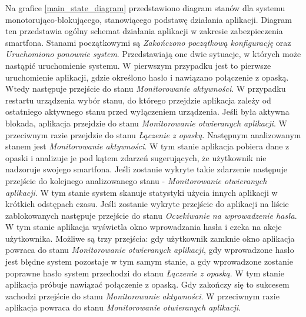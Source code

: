 Na grafice \ref{main_state_diagram} przedstawiono diagram stanów dla systemu monotorująco-blokującego, stanowiącego podstawę działania aplikacji. Diagram ten przedstawia ogólny schemat działania aplikacji w zakresie zabezpieczenia smartfona. Stanami początkowymi są \textit{Zakończono początkową konfigurację} oraz \textit{Uruchomiono ponownie system}. Przedstawiają one dwie sytuacje, w których może nastąpić uruchomienie systemu. W pierwszym przypadku jest to pierwsze uruchomienie aplikacji, gdzie określono hasło i nawiązano połączenie z opaską. Wtedy następuje przejście do stanu \textit{Monitorowanie aktywności}. W przypadku restartu urządzenia wybór stanu, do którego przejdzie aplikacja zależy od ostatniego aktywnego stanu przed wyłączeniem urządzenia. Jeśli była aktywna blokada, aplikacja przejdzie do stanu \textit{Monitorowanie otwieranych aplikacji}. W przeciwnym razie przejdzie do stanu \textit{Łączenie z opaską}.
\newline\newline
\indent Następnym analizowanym stanem jest \textit{Monitorowanie aktywności}. W tym stanie aplikacja pobiera dane z opaski i analizuje je pod kątem zdarzeń sugerujących, że użytkownik nie nadzoruje swojego smartfona. Jeśli zostanie wykryte takie zdarzenie następuje przejście do kolejnego analizowanego stanu - \textit{Monitorowanie otwieranych aplikacji}. W tym stanie system skanuje statystyki użycia innych aplikacji w krótkich odstępach czasu. Jeśli zostanie wykryte przejście do aplikacji na liście zablokowanych następuje przejście do stanu \textit{Oczekiwanie na wprowadzenie hasła}. W tym stanie aplikacja wyświetla okno wprowadzania hasła i czeka na akcje użytkownika. Możliwe są trzy przejścia: gdy użytkownik zamknie okno aplikacja powraca do stanu \textit{Monitorowanie otwieranych aplikacji}, gdy wprowadzone hasło jest błędne system pozostaje w tym samym stanie, a gdy wprowadzone zostanie poprawne hasło system przechodzi do stanu \textit{Łączenie z opaską}. W tym stanie aplikacja próbuje nawiązać połączenie z opaską. Gdy zakończy się to sukcesem zachodzi przejście do stanu \textit{Monitorowanie aktywności}. W przeciwnym razie aplikacja powraca do stanu \textit{Monitorowanie otwieranych aplikacji}.

